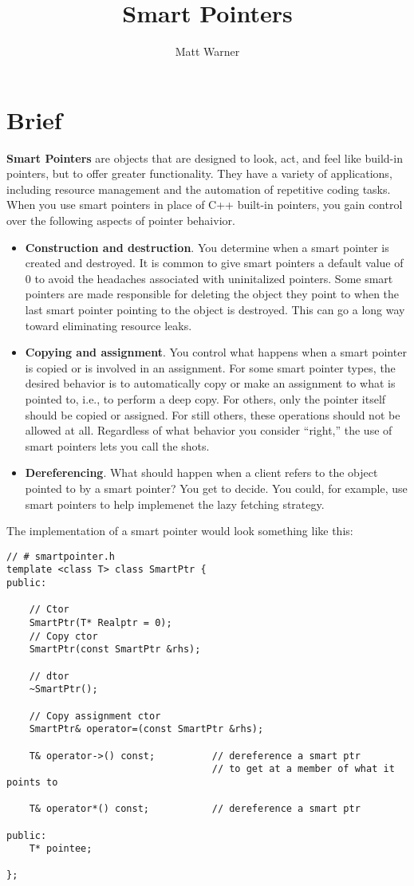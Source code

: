 \documentclass{report}
\title{\Huge{Smart Pointers}}
\author{\huge{Matt Warner}}
\date{\huge{}}
\begin{document}
    \maketitle
\section{Brief}
\textbf{Smart Pointers} are objects that are designed to look, act, and feel like build-in pointers, but to offer greater functionality. They have a variety of applications, including resource management and the automation of repetitive coding tasks.
\bigbreak \noindent
When you use smart pointers in place of C++ built-in pointers, you gain control over the following aspects of pointer behaivior.
\begin{itemize}
    \item \textbf{Construction and destruction}. You determine when a smart pointer is created and destroyed. It is common to give smart pointers a default value of 0 to avoid the headaches associated with uninitalized pointers. Some smart pointers are made responsible for deleting the object they point to when the last smart pointer pointing to the object is destroyed. This can go a long way toward eliminating resource leaks.
    \item \textbf{Copying and assignment}. You control what happens when a smart pointer is copied or is involved in an assignment. For some smart pointer types, the desired behavior is to automatically copy or make an assignment to what is pointed to, i.e., to perform a deep copy. For others, only the pointer itself should be copied or assigned. For still others, these operations should not be allowed at all. Regardless of what behavior you consider ``right,'' the use of smart pointers lets you call the shots.
    \item \textbf{Dereferencing}. What should happen when a client refers to the object pointed to by a smart pointer? You get to decide. You could, for example, use smart pointers to help implemenet the lazy fetching strategy.
\end{itemize}
The implementation of a smart pointer would look something like this:
\begin{verbatim}
// # smartpointer.h
template <class T> class SmartPtr {
public: 

    // Ctor
    SmartPtr(T* Realptr = 0);
    // Copy ctor
    SmartPtr(const SmartPtr &rhs);

    // dtor
    ~SmartPtr();

    // Copy assignment ctor
    SmartPtr& operator=(const SmartPtr &rhs);

    T& operator->() const;          // dereference a smart ptr
                                    // to get at a member of what it points to

    T& operator*() const;           // dereference a smart ptr

public:
    T* pointee;
    
};
\end{verbatim}
\end{document}
